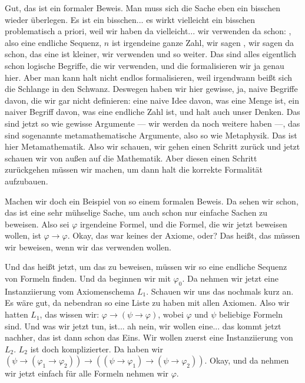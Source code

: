 \begin{spoken-clean}[00:22:30 - 00:24:45]
Gut, das ist ein formaler Beweis. Man muss sich die Sache eben ein bisschen wieder überlegen. Es ist ein bisschen... es wirkt vielleicht ein bisschen problematisch a priori, weil wir haben da vielleicht... wir verwenden da schon: , also eine endliche Sequenz, $n$ ist irgendeine ganze Zahl, wir sagen , wir sagen da schon, das eine ist kleiner, wir verwenden  und so weiter. Das sind alles eigentlich schon logische Begriffe, die wir verwenden, und die formalisieren wir ja genau hier. Aber man kann halt nicht endlos formalisieren, weil irgendwann beißt sich die Schlange in den Schwanz. Deswegen haben wir hier gewisse, ja, naive Begriffe davon, die wir gar nicht definieren: eine naive Idee davon, was eine Menge ist, ein naiver Begriff davon, was eine endliche Zahl ist, und halt auch unser Denken. Das sind jetzt so wie gewisse Argumente --- wir werden da noch weitere haben ---, das sind sogenannte metamathematische Argumente, also so wie Metaphysik. Das ist hier Metamathematik. Also wir schauen, wir gehen einen Schritt zurück und jetzt schauen wir von außen auf die Mathematik. Aber diesen einen Schritt zurückgehen müssen wir machen, um dann halt die korrekte Formalität aufzubauen.
\end{spoken-clean}

\begin{spoken-clean}[00:32:47 - 00:34:48]
Machen wir doch ein Beispiel von so einem formalen Beweis. Da sehen wir schon, das ist eine sehr mühselige Sache, um auch schon nur einfache Sachen zu beweisen. Also sei $\varphi$ irgendeine Formel, und die Formel, die wir jetzt beweisen wollen, ist $\varphi \rightarrow \varphi$. Okay, das war keines der Axiome, oder? Das heißt, das müssen wir beweisen, wenn wir das verwenden wollen.

Und das heißt jetzt, um das zu beweisen, müssen wir so eine endliche Sequenz von Formeln finden. Und da beginnen wir mit $\varphi_0$. Da nehmen wir jetzt eine Instanziierung vom Axiomenschema $L_1$. Schauen wir uns das nochmals kurz an. Es wäre gut, da nebendran so eine Liste zu haben mit allen Axiomen. Also wir hatten $L_1$, das wissen wir: $\varphi \rightarrow (\psi \rightarrow \varphi)$, wobei $\varphi$ und $\psi$ beliebige Formeln sind. Und was wir jetzt tun, ist... ah nein, wir wollen eine... das kommt jetzt nachher, das ist dann schon das Eins. Wir wollen zuerst eine Instanziierung von $L_2$. $L_2$ ist doch komplizierter. Da haben wir $(\psi \rightarrow (\varphi_1 \rightarrow \varphi_2)) \rightarrow ((\psi \rightarrow \varphi_1) \rightarrow (\psi \rightarrow \varphi_2))$. Okay, und da nehmen wir jetzt einfach für alle Formeln nehmen wir $\varphi$.
\end{spoken-clean}

